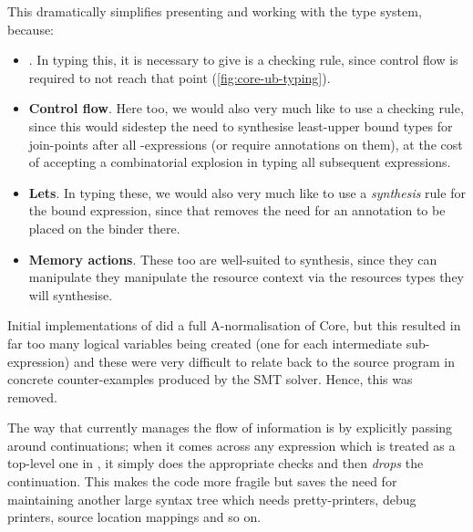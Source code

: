 This dramatically simplifies presenting and working with the type system, because:
\begin{itemize}
    \item {}. In typing this, it is necessary to give is a %
        checking rule, since control flow is required to not reach that point
        (\cref{fig:core-ub-typing}).
    \item \textbf{Control flow}. Here too, we would also very much like to use
        a checking rule, since this would sidestep the need to synthesise
        least-upper bound types for join-points after all 
        -expressions (or require annotations on them), at the
        cost of accepting a combinatorial explosion in typing all subsequent
        expressions.
    \item \textbf{Lets}. In typing these, we would also very much like to use a
        \emph{synthesis} rule for the bound expression, since that removes the
        need for an annotation to be placed on the binder there.
    \item \textbf{Memory actions}. These too are well-suited to synthesis, since
        they can manipulate they manipulate the resource context via the
        resources types they will synthesise.
\end{itemize}

Initial implementations of  did a full A-normalisation of Core, but this resulted
in far too many logical variables being created (one for each intermediate
sub-expression) and these were very difficult to relate back to the source
program in concrete counter-examples produced by the SMT
solver. Hence, this was
removed.\label{sn:rm-anorm}

The way that  currently manages the flow of information is by explicitly
passing around continuations; when it comes across any expression which is
treated as a top-level one in , it simply does the appropriate
checks and then \emph{drops} the continuation.\label{sn:use-conts}
This makes the code more fragile but saves the need for maintaining another large
syntax tree which needs pretty-printers, debug printers, source location
mappings and so on.

